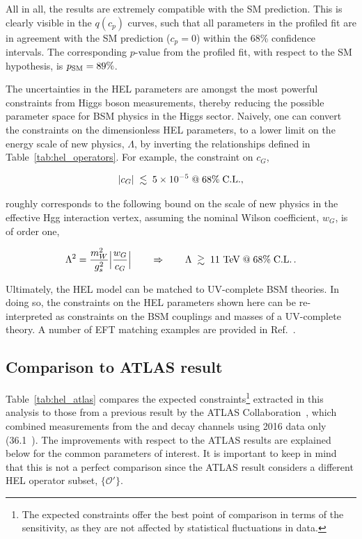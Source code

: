 All in all, the results are extremely compatible with the SM prediction. This is clearly visible in the $q(c_p)$ curves, such that all parameters in the profiled fit are in agreement with the SM prediction ($c_p=0$) within the 68\% confidence intervals. The corresponding $p$-value from the profiled fit, with respect to the SM hypothesis, is $p_{\rm{SM}}=89\%$. 

The uncertainties in the HEL parameters are amongst the most powerful constraints from Higgs boson measurements, thereby reducing the possible parameter space for BSM physics in the Higgs sector. Naively, one can convert the constraints on the dimensionless HEL parameters, to a lower limit on the energy scale of new physics, $\Lambda$, by inverting the relationships defined in Table~\ref{tab:hel_operators}. For example, the constraint on $c_G$,

\begin{equation}
    |c_G| \; \lesssim \; 5 \times 10^{-5} \; {\rm{@}} \; 68\% \; {\rm{C.L.}},
\end{equation}

\noindent
roughly corresponds to the following bound on the scale of new physics in the effective Hgg interaction vertex, assuming the nominal Wilson coefficient, $w_G$, is of order one,

\begin{equation}
    \Lambda^2 = \frac{m_W^2}{g_s^2}\Big| \frac{w_G}{c_G} \Big| \qquad \Rightarrow \qquad \Lambda \; \gtrsim \; 11~{\rm{TeV}} \; {\rm{@}} \; 68\% \; {\rm{C.L.}}\,.
\end{equation}

\noindent
Ultimately, the HEL model can be matched to UV-complete BSM theories. In doing so, the constraints on the HEL parameters shown here can be re-interpreted as constraints on the BSM couplings and masses of a UV-complete theory. A number of EFT matching examples are provided in Ref.~\cite{Marzocca:2020jze}. 

\subsection{Comparison to ATLAS result}
Table~\ref{tab:hel_atlas} compares the expected constraints\footnote{The expected constraints offer the best point of comparison in terms of the sensitivity, as they are not affected by statistical fluctuations in data.} extracted in this analysis to those from a previous result by the ATLAS Collaboration~\cite{ATL-PHYS-PUB-2017-018}, which combined measurements from the \Hgg and \Hfl decay channels using 2016 data only (36.1~\fbinv). The improvements with respect to the ATLAS results are explained below for the common parameters of interest. It is important to keep in mind that this is not a perfect comparison since the ATLAS result considers a different HEL operator subset, $\{\mathcal{O}'\}$.

